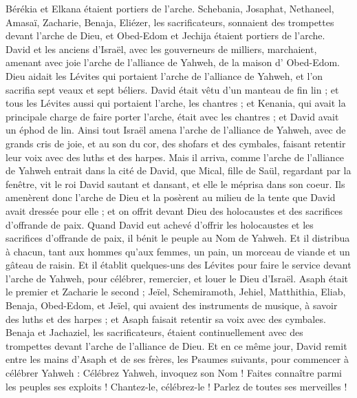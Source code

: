 \begin{multicols}{2}
Bérékia et Elkana étaient portiers de l’arche.
Schebania, Josaphat, Nethaneel, Amasaï, Zacharie, Benaja, Eliézer, les sacrificateurs, sonnaient des trompettes devant l’arche de Dieu, et Obed-Edom et Jechija étaient portiers de l’arche.
David et les anciens d'Israël, avec les gouverneurs de milliers, marchaient, amenant avec joie l’arche de l'alliance de Yahweh, de la maison d' Obed-Edom.
Dieu aidait les Lévites qui portaient l’arche de l'alliance de Yahweh, et l’on sacrifia sept veaux et sept béliers.
David était vêtu d'un manteau de fin lin ; et tous les Lévites aussi qui portaient l’arche, les chantres ;  et Kenania, qui avait la principale charge de faire porter l’arche, était avec les chantres ; et David avait un éphod de lin.
Ainsi tout Israël amena l’arche de l'alliance de Yahweh, avec de grands cris de joie, et au son du cor, des shofars et des cymbales, faisant retentir leur voix avec des luths et des harpes.
Mais il arriva, comme l’arche de l'alliance de Yahweh entrait dans la cité de David, que Mical, fille de Saül, regardant par la fenêtre, vit le roi David sautant et dansant, et elle le méprisa dans son coeur.
\VerseOne{}Ils amenèrent donc l’arche de Dieu et la posèrent au milieu de la tente que David avait dressée pour elle ; et on offrit devant Dieu des holocaustes et des sacrifices d’offrande de paix.
Quand David eut achevé d'offrir les holocaustes et les sacrifices d’offrande de paix, il bénit le peuple au Nom de Yahweh.
Et il distribua à chacun, tant aux hommes qu'aux femmes, un pain,  un morceau de viande et un gâteau de raisin.
Et il établit quelques-uns des Lévites pour faire le service devant l’arche de Yahweh, pour célébrer, remercier, et louer le Dieu d'Israël.
Asaph était le premier et Zacharie le second ; Jeïel, Schemiramoth, Jehiel, Matthithia, Eliab, Benaja, Obed-Edom, et Jeïel, qui avaient des instruments de musique, à savoir des luths et des harpes ; et Asaph faisait retentir sa voix avec des cymbales.
Benaja et Jachaziel, les sacrificateurs, étaient continuellement avec des trompettes devant l’arche de l'alliance de Dieu.
Et en ce même jour, David remit entre les mains d'Asaph et de ses frères, les Psaumes suivants, pour commencer à célébrer Yahweh :
Célébrez Yahweh, invoquez son Nom ! Faites connaître parmi les peuples ses exploits !
Chantez-le,  célébrez-le !  Parlez de toutes ses merveilles !

\end{multicols}
